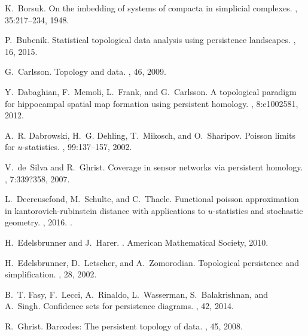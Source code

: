 \documentclass[11pt]{amsart}
\numberwithin{equation}{section}
\theoremstyle{plain}
\theoremstyle{definition}
\begin{document}
\begin{thebibliography}{10}
K.~Borsuk.
\newblock On the imbedding of systems of compacta in simplicial complexes.
, 35:217--234, 1948.

P.~Bubenik.
\newblock Statistical topological data analysis using persistence landscapes.
, 16, 2015.

G.~Carlsson.
\newblock Topology and data.
, 46, 2009.

Y.~Dabaghian, F.~Memoli, L.~Frank, and G.~Carlsson.
\newblock A topological paradigm for hippocampal spatial map formation using
  persistent homology.
, 8:e1002581, 2012.

A.~R. Dabrowski, H.~G. Dehling, T.~Mikosch, and O.~Sharipov.
\newblock Poisson limits for $u$-statistics.
, 99:137--157, 2002.

V.~de~Silva and R.~Ghrist.
\newblock Coverage in sensor networks via persistent homology.
, 7:339?358, 2007.

L.~Decreusefond, M.~Schulte, and C.~Thaele.
\newblock Functional poisson approximation in kantorovich-rubinstein distance
  with applications to $u$-statistics and stochastic geometry.
, 2016.
.

H.~Edelsbrunner and J.~Harer.
.
\newblock American Mathematical Society, 2010.

H.~Edelsbrunner, D.~Letscher, and A.~Zomorodian.
\newblock Topological persistence and simplification.
, 28, 2002.

B.~T. Fasy, F.~Lecci, A.~Rinaldo, L.~Wasserman, S.~Balakrishnan, and A.~Singh.
\newblock Confidence sets for persistence diagrams.
, 42, 2014.

R.~Ghrist.
\newblock Barcodes: The persistent topology of data.
, 45, 2008.


\end{thebibliography}
\end{document}

